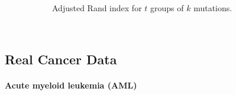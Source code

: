 \setlength{}
\setlength{}
\renewcommand{\subflen}{\textwidth}
\renewcommand{\scspacey}{-0.3em}
\renewcommand{\scspacex}{0.2em}
\begin{figure}[htb]
  \centering
  \begin{subfigure}[b]{\subflen}
    \centering
    
    \caption{}
    \label{fig:syn_single}
  \end{subfigure}\\[2em]
  \begin{subfigure}[b]{\subflen}
    \centering
    
    \caption{Adjusted Rand index for $t$ groups of $k$ mutations.}
    \label{fig:syn_multi}
  \end{subfigure}\\[1em]
  \caption{
    \todo{}
  }
  \label{fig:syn2}
\end{figure}

\subsection{Real Cancer Data}

\paragraph{Acute myeloid leukemia (AML)}

